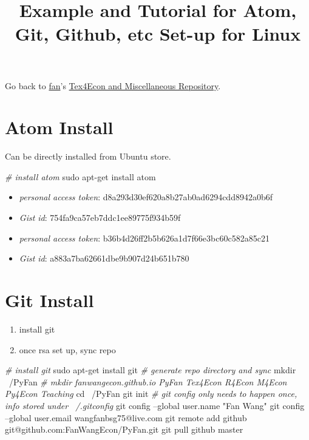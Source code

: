 \documentclass[
]{article}
\title{Example and Tutorial for Atom, Git, Github, etc Set-up for Linux}
\author{}
\date{\vspace{-2.5em}}
\newenvironment{Shaded}{\begin{snugshade}}{\end{snugshade}}
\newcommand{\BuiltInTok}[1]{#1}
\newcommand{\CommentTok}[1]{\textcolor[rgb]{0.56,0.35,0.01}{\textit{#1}}}
\newcommand{\FunctionTok}[1]{\textcolor[rgb]{0.00,0.00,0.00}{#1}}
\newcommand{\NormalTok}[1]{#1}
\newcommand{\StringTok}[1]{\textcolor[rgb]{0.31,0.60,0.02}{#1}}
\providecommand{\tightlist}{%
  \setlength{\itemsep}{0pt}\setlength{\parskip}{0pt}}
\begin{document}
\maketitle

Go back to \href{http://fanwangecon.github.io/}{fan}'s
\href{http://fanwangecon.github.io/Tex4Econ/}{Tex4Econ and Miscellaneous
Repository}.

\hypertarget{atom-install}{%
\section{Atom Install}\label{atom-install}}

Can be directly installed from Ubuntu store.

\begin{Shaded}
\begin{Highlighting}[]
\CommentTok{# install atom}
\FunctionTok{sudo}\NormalTok{ apt-get install atom}
\end{Highlighting}
\end{Shaded}

\begin{itemize}
\item
  \emph{personal access token}: d8a293d30ef620a8b27ab0ad6294cdd8942a0b6f
\item
  \emph{Gist id}: 754fa9ca57eb7ddc1ee89775f934b59f
\item
  \emph{personal access token}: b36b4d26ff2b5b626a1d7f66e3bc60c582a85c21
\item
  \emph{Gist id}: a883a7ba62661dbe9b907d24b651b780
\end{itemize}

\hypertarget{git-install}{%
\section{Git Install}\label{git-install}}

\begin{enumerate}
\def\labelenumi{\arabic{enumi}.}
\tightlist
\item
  install git
\item
  once rsa set up, sync repo
\end{enumerate}

\begin{Shaded}
\begin{Highlighting}[]
\CommentTok{# install git}
\FunctionTok{sudo}\NormalTok{ apt-get install git}
\CommentTok{# generate repo directory and sync}
\FunctionTok{mkdir}\NormalTok{ ~/PyFan}
\CommentTok{# mkdir fanwangecon.github.io PyFan Tex4Econ R4Econ M4Econ Py4Econ Teaching}
\BuiltInTok{cd}\NormalTok{ ~/PyFan}
\FunctionTok{git}\NormalTok{ init}
\CommentTok{# git config only needs to happen once, info stored under ~/.gitconfig}
\FunctionTok{git}\NormalTok{ config --global user.name }\StringTok{"Fan Wang"}
\FunctionTok{git}\NormalTok{ config --global user.email wangfanbsg75@live.com}
\FunctionTok{git}\NormalTok{ remote add github git@github.com:FanWangEcon/PyFan.git}
\FunctionTok{git}\NormalTok{ pull github master}
\end{Highlighting}
\end{Shaded}
\end{document}
